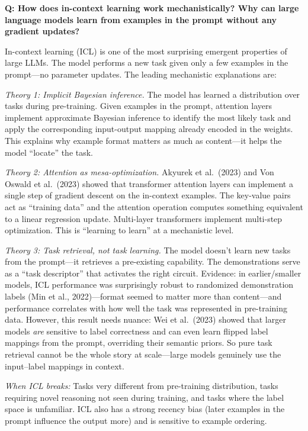 \begin{interviewq}
\textbf{Q: How does in-context learning work mechanistically? Why can large language models learn from examples in the prompt without any gradient updates?}

 \quad {} \quad \badgefreq{\freqlow}

\stronganswer In-context learning (ICL) is one of the most surprising emergent properties of large LLMs. The model performs a new task given only a few examples in the prompt---no parameter updates. The leading mechanistic explanations are:

\textit{Theory 1: Implicit Bayesian inference.} The model has learned a distribution over tasks during pre-training. Given examples in the prompt, attention layers implement approximate Bayesian inference to identify the most likely task and apply the corresponding input-output mapping already encoded in the weights. This explains why example format matters as much as content---it helps the model ``locate'' the task.

\textit{Theory 2: Attention as mesa-optimization.} Akyurek et al.\ (2023) and Von Oswald et al.\ (2023) showed that transformer attention layers can implement a single step of gradient descent on the in-context examples. The key-value pairs act as ``training data'' and the attention operation computes something equivalent to a linear regression update. Multi-layer transformers implement multi-step optimization. This is ``learning to learn'' at a mechanistic level.

\textit{Theory 3: Task retrieval, not task learning.} The model doesn't learn new tasks from the prompt---it retrieves a pre-existing capability. The demonstrations serve as a ``task descriptor'' that activates the right circuit. Evidence: in earlier/smaller models, ICL performance was surprisingly robust to randomized demonstration labels (Min et al., 2022)---format seemed to matter more than content---and performance correlates with how well the task was represented in pre-training data. However, this result needs nuance: Wei et al.\ (2023) showed that larger models \emph{are} sensitive to label correctness and can even learn flipped label mappings from the prompt, overriding their semantic priors. So pure task retrieval cannot be the whole story at scale---large models genuinely use the input--label mappings in context.

\textit{When ICL breaks:} Tasks very different from pre-training distribution, tasks requiring novel reasoning not seen during training, and tasks where the label space is unfamiliar. ICL also has a strong recency bias (later examples in the prompt influence the output more) and is sensitive to example ordering.


\end{interviewq}
